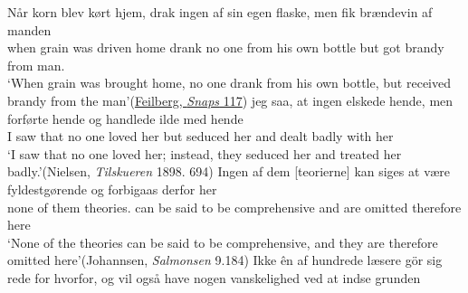 \ex 
 \gll Når korn blev kørt hjem, drak ingen af sin egen flaske, men fik brændevin af manden\\
 when grain was driven home drank {no one} from his own bottle but got brandy from man.\DEF{}\\
\glt `When grain was brought home, no one drank from his own bottle, but received brandy from the man'\hfill(\href{https://archive.org/details/dania06samfgoog/page/n123/mode/2up?q=%22drak+ingen+af+sin+egen+flaske%22&view=theater}{Feilberg, \textit{Snaps} 117})
\ex 
 \gll jeg saa, at ingen elskede hende, men forførte hende og handlede ilde med hende\\
 I saw that {no one} loved her but seduced her and dealt badly with her\\
\glt `I saw that no one loved her; instead, they seduced her and treated her badly.'\hfill(Nielsen, \textit{Tilskueren} 1898. 694) %
\ex 
 \gll Ingen af dem [teorierne] kan siges at være fyldestgørende og forbigaas derfor her\\
 none of them theories.\DEF{} can {be said} to be comprehensive and {are omitted} therefore here\\
\glt `None of the theories can be said to be comprehensive, and they are therefore omitted here'\hfill(Johannsen, \textit{Salmonsen} 9.184) %
\ex 
 \gll Ikke ên af hundrede læsere gör sig rede for hvorfor, og vil også have nogen vanskelighed ved at indse grunden\\ %
